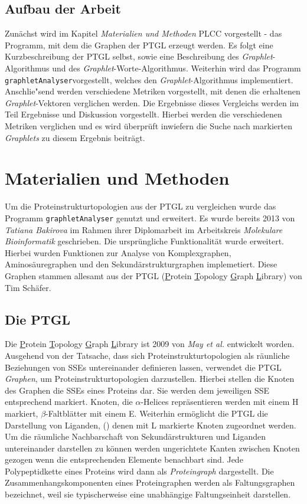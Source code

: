 \documentclass{report}
\begin{document}
\section{Aufbau der Arbeit}

Zun\"achst wird im Kapitel \emph{Materialien und Methoden} PLCC vorgestellt - das Programm, mit dem die Graphen der PTGL erzeugt werden.
Es folgt eine Kurzbeschreibung der PTGL selbst, sowie eine Beschreibung des \textit{Graphlet}-Algorithmus und des \textit{Graphlet}-Worte-Algorithmus.
Weiterhin wird das Programm \texttt{graphletAnalyser}vorgestellt, welches den \textit{Graphlet}-Algorithmus implementiert.
Anschlie"send werden verschiedene Metriken vorgestellt, mit denen die erhaltenen \textit{Graphlet}-Vektoren verglichen werden.
Die Ergebnisse dieses Vergleichs werden im Teil Ergebnisse und Diskussion vorgestellt. Hierbei werden die verschiedenen Metriken verglichen und es wird \"uberpr\"uft inwiefern die Suche nach markierten \textit{Graphlets} zu diesem Ergebnis beitr\"agt.

\chapter{Materialien und Methoden}

Um die Proteinstrukturtopologien aus der PTGL zu vergleichen wurde das Programm \texttt{graphletAnalyser} genutzt und erweitert. Es wurde bereits 2013 von \textit{Tatiana Bakirova} im Rahmen ihrer Diplomarbeit im Arbeitskreis \textit{Molekulare Bioinformatik} geschrieben. Die urspr\"ungliche Funktionalität wurde erweitert. Hierbei wurden Funktionen zur Analyse von Komplexgraphen, Aminos\"auregraphen und den Sekund\"arstrukturgraphen implemetiert. Diese Graphen stammen allesamt aus der PTGL (\underline{P}rotein \underline{T}opology \underline{G}raph \underline{L}ibrary) von Tim Sch\"afer.


\section{Die PTGL}


Die \underline{P}rotein \underline{T}opology \underline{G}raph \underline{L}ibrary ist 2009 von \textit{May et al.} \cite{ptgl1} entwickelt worden. Ausgehend von der Tatsache, dass sich Proteinstrukturtopologien als r\"aunliche Beziehungen von SSEs untereinander definieren lassen, verwendet die PTGL \emph{Graphen}, um Proteinstrukturtopologien darzustellen.
Hierbei stellen die Knoten des Graphen die SSEs eines Proteins dar. Sie werden dem jeweiligen SSE entsprechend markiert. Knoten, die $\alpha$-Helices repr\"asentieren werden mit einem H markiert, $\beta$-Faltbl\"atter mit einem E. Weiterhin erm\"oglicht die PTGL die Darstellung von Liganden, (\cite{vplg}) denen mit L markierte Knoten zugeordnet werden. Um die r\"aumliche Nachbarschaft von Sekund\"arstrukturen und Liganden untereinander darstellen zu k\"onnen werden ungerichtete Kanten zwischen Knoten gezogen wenn die entsprechenden Elemente benachbart sind. Jede Polypeptidkette eines Proteins wird dann als \emph{Proteingraph} dargestellt. Die Zusammenhangskomponenten eines Proteingraphen werden als Faltungsgraphen bezeichnet, weil sie typischerweise eine unabh\"angige Faltungseinheit darstellen.
\end{document}
